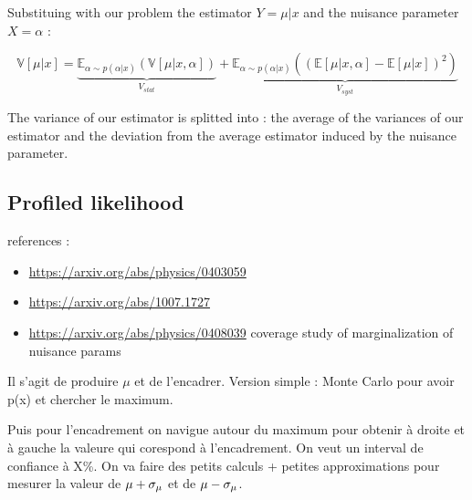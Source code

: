 Substituing with our problem the estimator $Y = \mu|x$ and the nuisance parameter $X = \alpha$ :

\begin{equation}
\label{eq:stat_and_syst_variance_definition}
\mathbb{V}[\mu|x] 
	= \underbrace{\mathbb{E}_{\alpha \sim p(\alpha|x)} \left (\mathbb{V}[\mu|x, \alpha] \right )}_{V_{stat}} 
	+ \underbrace{\mathbb{E}_{\alpha \sim p(\alpha|x)} \left ( (\mathbb{E} [\mu|x, \alpha]  - \mathbb{E}[\mu|x])^2\right )}_{V_{syst}}
\end{equation}

The variance of our estimator is splitted into :
the average of the variances of our estimator and the deviation from the average estimator induced by the nuisance parameter.







\subsection{Profiled likelihood} %
\label{sub:profiled_likelihood}




references : 
\begin{itemize}
	\item \url{https://arxiv.org/abs/physics/0403059}
	\item \url{https://arxiv.org/abs/1007.1727}
	\item \url{https://arxiv.org/abs/physics/0408039} coverage study of marginalization of nuisance params
\end{itemize}




Il s'agit de produire $\mu$ et de l'encadrer.
Version simple : Monte Carlo pour avoir p(x) et chercher le maximum.

Puis pour l'encadrement on navigue autour du maximum pour obtenir à droite et à gauche la valeure qui corespond à l'encadrement.
On veut un interval de confiance à X\%.
On va faire des petits calculs + petites approximations pour mesurer la valeur de $\mu + \sigma_\mu$ et de $\mu - \sigma_\mu$.


